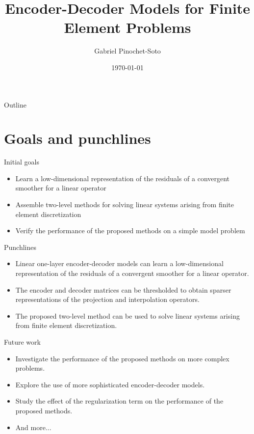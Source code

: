 \documentclass{beamer}
\title{Encoder-Decoder Models for Finite Element Problems}
\author{Gabriel Pinochet-Soto}
\date{\today}
\begin{document}
\begin{frame}
\titlepage
\end{frame}

\begin{frame}{Outline}
\tableofcontents
\end{frame}

\section{Goals and punchlines}
\begin{frame}{Initial goals}
\begin{itemize}
    \item Learn a low-dimensional representation of the residuals of a convergent smoother for a linear operator
    \item Assemble two-level methods for solving linear systems arising from finite element discretization
    \item Verify the performance of the proposed methods on a simple model problem
\end{itemize}
\end{frame}

\begin{frame}{Punchlines}
\begin{itemize}
    \item Linear one-layer encoder-decoder models can learn a low-dimensional representation of the residuals of a convergent smoother for a linear operator.
    \item The encoder and decoder matrices can be thresholded to obtain sparser representations of the projection and interpolation operators.
    \item The proposed two-level method can be used to solve linear systems arising from finite element discretization.
\end{itemize}
\end{frame}

\begin{frame}{Future work}
\begin{itemize}
    \item Investigate the performance of the proposed methods on more complex problems.
    \item Explore the use of more sophisticated encoder-decoder models.
    \item Study the effect of the regularization term on the performance of the proposed methods.
    \item And more...
\end{itemize}
\end{frame}
\end{document}
